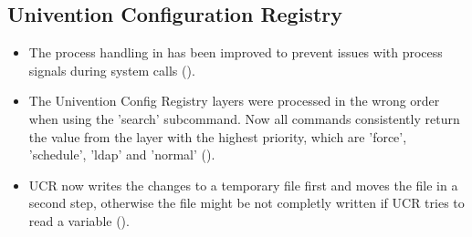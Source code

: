 \subsection{Univention Configuration Registry}
\begin{itemize}
\item The process handling in  has been improved to prevent issues with process
  signals during system calls ().

\item The Univention Config Registry layers were processed in the wrong order when using the 'search' subcommand. Now all commands consistently return the value from the layer with the highest priority, which are 'force', 'schedule', 'ldap' and 'normal' ().

\item UCR now writes the changes to a temporary file first and moves the file
in a second step, otherwise the file might be not completly written if UCR
tries to read a variable ().
\end{itemize}







